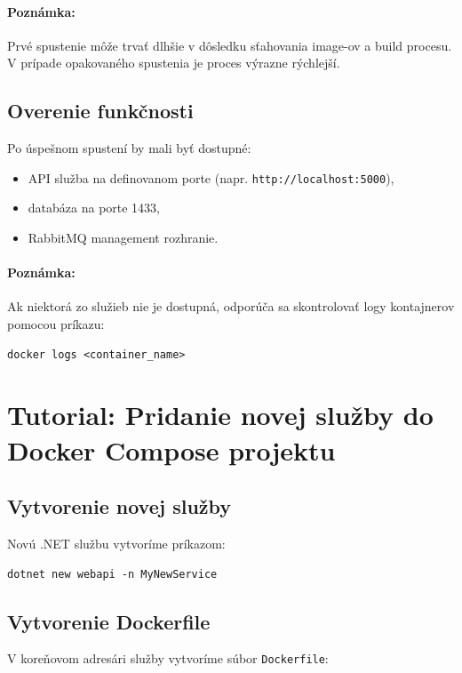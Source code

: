 \paragraph{Poznámka:}
Prvé spustenie môže trvať dlhšie v dôsledku sťahovania image-ov a build procesu. 
V prípade opakovaného spustenia je proces výrazne rýchlejší.

\subsection{Overenie funkčnosti}

Po úspešnom spustení by mali byť dostupné:
\begin{itemize}
    \item API služba na definovanom porte (napr. \texttt{http://localhost:5000}),
    \item databáza na porte 1433,
    \item RabbitMQ management rozhranie.
\end{itemize}

\paragraph{Poznámka:}
Ak niektorá zo služieb nie je dostupná, odporúča sa skontrolovať logy kontajnerov pomocou príkazu:
\begin{verbatim}
docker logs <container_name>
\end{verbatim}

\clearpage

\section{Tutorial: Pridanie novej služby do Docker Compose projektu}

\subsection{Vytvorenie novej služby}

Novú .NET službu vytvoríme príkazom:

\begin{verbatim}
dotnet new webapi -n MyNewService
\end{verbatim}

\subsection{Vytvorenie Dockerfile}

V koreňovom adresári služby vytvoríme súbor \texttt{Dockerfile}:

